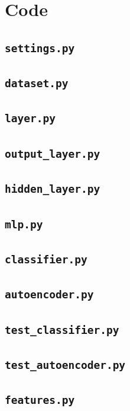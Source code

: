 \documentclass[a4paper, 12pt, titlepage]{article}
\begin{document}
  \pagebreak
  \appendix
  \section{Code}
  \subsection{\texttt{settings.py}}
  
  \subsection{\texttt{dataset.py}}
  
  \subsection{\texttt{layer.py}}
  
  \subsection{\texttt{output\_layer.py}}
  
  \subsection{\texttt{hidden\_layer.py}}
  
  \subsection{\texttt{mlp.py}}
  
  \subsection{\texttt{classifier.py}}
  
  \subsection{\texttt{autoencoder.py}}
  
  \subsection{\texttt{test\_classifier.py}}
  
  \subsection{\texttt{test\_autoencoder.py}}
  
  \subsection{\texttt{features.py}}
  
\end{document}
